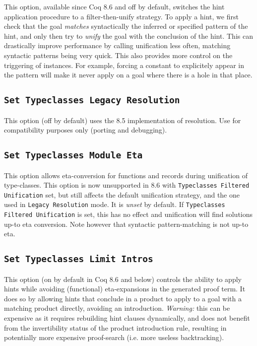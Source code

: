 This option, available since Coq 8.6 and off by default, switches the
hint application procedure to a filter-then-unify strategy. To apply a
hint, we first check that the goal \emph{matches} syntactically the
inferred or specified pattern of the hint, and only then try to
\emph{unify} the goal with the conclusion of the hint. This can
drastically improve performance by calling unification less often,
matching syntactic patterns being very quick. This also provides more
control on the triggering of instances.  For example, forcing a constant
to explicitely appear in the pattern will make it never apply on a goal
where there is a hole in that place.

\subsection{\tt Set Typeclasses Legacy Resolution}

This option (off by default) uses the 8.5 implementation of resolution.
Use for compatibility purposes only (porting and debugging).

\subsection{\tt Set Typeclasses Module Eta}

This option allows eta-conversion for functions and records during
unification of type-classes. This option is now unsupported in 8.6 with
{\tt Typeclasses Filtered Unification} set, but still affects the
default unification strategy, and the one used in {\tt Legacy
  Resolution} mode. It is \emph{unset} by default. If {\tt Typeclasses
  Filtered Unification} is set, this has no effect and unification will
find solutions up-to eta conversion. Note however that syntactic
pattern-matching is not up-to eta.

\subsection{\tt Set Typeclasses Limit Intros}

This option (on by default in Coq 8.6 and below) controls the ability to
apply hints while avoiding (functional) eta-expansions in the generated
proof term. It does so by allowing hints that conclude in a product to
apply to a goal with a matching product directly, avoiding an
introduction. \emph{Warning:} this can be expensive as it requires
rebuilding hint clauses dynamically, and does not benefit from the
invertibility status of the product introduction rule, resulting in
potentially more expensive proof-search (i.e. more useless
backtracking).

